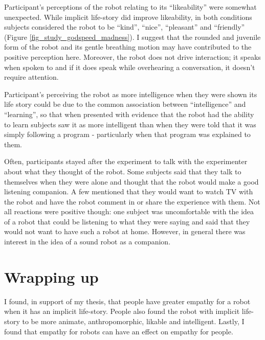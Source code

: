 Participant's perceptions of the robot relating to its ``likeability'' were somewhat unexpected. While implicit life-story did improve likeability, in both conditions subjects considered the robot to be ``kind'', ``nice'', ``pleasant'' and ``friendly'' (Figure \ref{fig_study_godspeed_madness}). I suggest that the rounded and juvenile form of the robot and its gentle breathing motion may have contributed to the positive perception here. Moreover, the robot does not drive interaction; it speaks when spoken to and if it does speak while overhearing a conversation, it doesn't require attention.


Participant's perceiving the robot as more intelligence when they were shown its life story could be due to the common association between ``intelligence'' and ``learning'', so that when presented with evidence that the robot had the ability to learn subjects saw it as more intelligent than when they were told that it was simply following a program - particularly when that program was explained to them.

Often, participants stayed after the experiment to talk with the experimenter about what they thought of the robot. Some subjects said that they talk to themselves when they were alone and thought that the robot would make a good listening companion. A few mentioned that they would want to watch TV with the robot and have the robot comment in or share the experience with them. Not all reactions were positive though: one subject was uncomfortable with the idea of a robot that could be listening to what they were saying and said that they would not want to have such a robot at home. However, in general there was interest in the idea of a sound robot as a companion. 


\section{Wrapping up}

I found, in support of my thesis, that people have greater empathy for a robot when it has an implicit life-story.  People also found the robot with implicit life-story to be more animate, anthropomorphic, likable and intelligent. Lastly, I found that empathy for robots can have an effect on empathy for people. 





